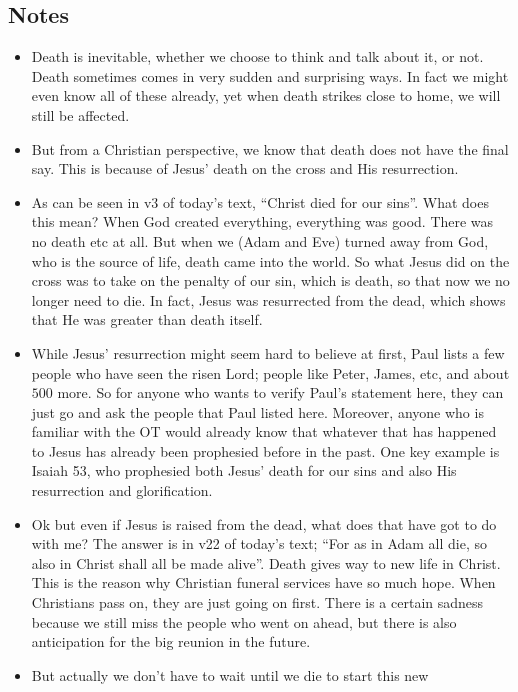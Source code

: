 \subsection*{Notes}
\begin{itemize}
  \item{Death is inevitable, whether we choose to think and talk about it, or
  not.  Death sometimes comes in very sudden and surprising ways.  In fact we
  might even know all of these already, yet when death strikes close to home,
  we will still be affected.}
  \item{But from a Christian perspective, we know that death does not have
  the final say.  This is because of Jesus' death on the cross and His
  resurrection.}
  \item{As can be seen in v3 of today's text, ``Christ died for our sins''.
  What does this mean?  When God created everything, everything was good.
  There was no death etc at all.  But when we (Adam and Eve) turned away from
  God, who is the source of life, death came into the world.  So what Jesus
  did on the cross was to take on the penalty of our sin, which is death, so
  that now we no longer need to die.  In fact, Jesus was resurrected from the
  dead, which shows that He was greater than death itself.}
  \item{While Jesus' resurrection might seem hard to believe at first, Paul
  lists a few people who have seen the risen Lord; people like Peter, James,
  etc, and about $500$ more.  So for anyone who wants to verify Paul's
  statement here, they can just go and ask the people that Paul listed here.
  Moreover, anyone who is familiar with the OT would already know that
  whatever that has happened to Jesus has already been prophesied before in
  the past.  One key example is Isaiah 53, who prophesied both Jesus' death
  for our sins and also His resurrection and glorification.}
  \item{Ok but even if Jesus is raised from the dead, what does that have got
  to do with me?  The answer is in v22 of today's text; ``For as in Adam all
  die, so also in Christ shall all be made alive''.  Death gives way to new
  life in Christ.  This is the reason why Christian funeral services have so
  much hope.  When Christians pass on, they are just going on first.  There
  is a certain sadness because we still miss the people who went on ahead,
  but there is also anticipation for the big reunion in the future.}
  \item{But actually we don't have to wait until we die to start this new
}
\end{itemize}
